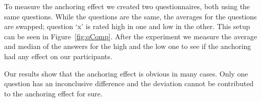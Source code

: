 \documentclass[main.tex]{subfiles}
\begin{document}
To measure the anchoring effect we created two questionnaires, both using the same questions. While the questions are the same, the averages for the questions are swapped; question `x' is rated high in one and low in the other. This setup can be seen in Figure~\ref{fig:qComp}. After the experiment we measure the average and median of the answers for the high and the low one to see if the anchoring had any effect on our participants.

Our results show that the anchoring effect is obvious in many cases. Only one question has an inconclusive difference and the deviation cannot be contributed to the anchoring effect for sure.
\end{document}
